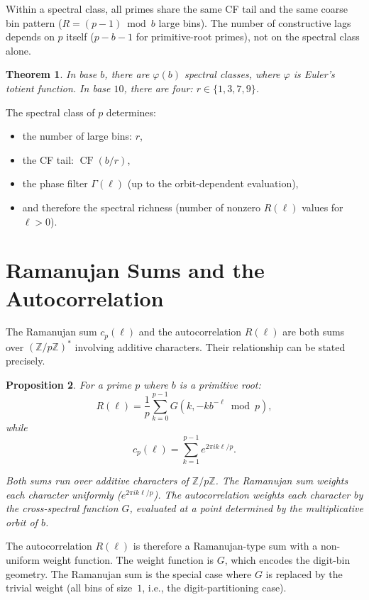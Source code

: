 \documentclass[12pt]{amsart}
\newtheorem{theorem}{Theorem}
\newtheorem{proposition}[theorem]{Proposition}
\theoremstyle{definition}
\theoremstyle{remark}
\begin{document}
Within a spectral class, all primes share the same CF tail
and the same coarse bin pattern ($R = (p{-}1) \bmod b$
large bins). The number of constructive lags depends on
$p$ itself ($p - b - 1$ for primitive-root primes), not
on the spectral class alone.

\begin{theorem}\label{thm:spectral-classes}
In base $b$, there are $\varphi(b)$ spectral classes, where
$\varphi$ is Euler's totient function. In base $10$, there are
four: $r \in \{1, 3, 7, 9\}$.
\end{theorem}

The spectral class of $p$ determines:
\begin{itemize}
\item the number of large bins: $r$,
\item the CF tail: $\operatorname{CF}(b/r)$,
\item the phase filter $\Gamma(\ell)$ (up to the orbit-dependent
      evaluation),
\item and therefore the spectral richness (number of nonzero
      $R(\ell)$ values for $\ell > 0$).
\end{itemize}

\section{Ramanujan Sums and the Autocorrelation}

The Ramanujan sum $c_p(\ell)$ and the autocorrelation $R(\ell)$
are both sums over $(\mathbb{Z}/p\mathbb{Z})^{*}$ involving
additive characters. Their relationship can be stated precisely.

\begin{proposition}\label{prop:ramanujan-R}
For a prime $p$ where $b$ is a primitive root:
\[
R(\ell) = \frac{1}{p} \sum_{k=0}^{p-1}
G(k, -kb^{-\ell} \bmod p),
\]
while
\[
c_p(\ell) = \sum_{k=1}^{p-1} e^{2\pi i k\ell/p}.
\]

Both sums run over additive characters of
$\mathbb{Z}/p\mathbb{Z}$. The Ramanujan sum weights each
character uniformly ($e^{2\pi ik\ell/p}$). The autocorrelation
weights each character by the cross-spectral function $G$,
evaluated at a point determined by the multiplicative orbit of
$b$.
\end{proposition}

The autocorrelation $R(\ell)$ is therefore a Ramanujan-type sum
with a non-uniform weight function. The weight function is $G$,
which encodes the digit-bin geometry. The Ramanujan sum is the
special case where $G$ is replaced by the trivial weight (all
bins of size~$1$, i.e., the digit-partitioning case).
\end{document}
